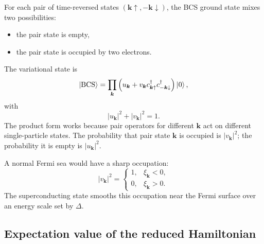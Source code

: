 \documentclass[11pt]{article}
\numberwithin{equation}{section}
\newcommand{\kvec}{\bm{k}}
\begin{document}
For each pair of time-reversed states $(\kvec\uparrow,-\kvec\downarrow)$, the BCS ground state mixes two possibilities:
\begin{itemize}[leftmargin=2em]
\item the pair state is empty,
\item the pair state is occupied by two electrons.
\end{itemize}
The variational state is
\begin{equation}
\ket{\mathrm{BCS}}=\prod_{\kvec} \left(u_{\kvec}+v_{\kvec} c_{\kvec\uparrow}^{\dagger}c_{-\kvec\downarrow}^{\dagger}\right)\ket{0},
\label{eq:bcs_state}
\end{equation}
with
\begin{equation}
|u_{\kvec}|^2+|v_{\kvec}|^2=1.
\end{equation}
The product form works because pair operators for different $\kvec$ act on different single-particle states. The probability that pair state $\kvec$ is occupied is $|v_{\kvec}|^2$; the probability it is empty is $|u_{\kvec}|^2$.

A normal Fermi sea would have a sharp occupation:
\begin{equation}
|v_{\kvec}|^2=\begin{cases}1,& \xi_{\kvec}<0,\\0,&\xi_{\kvec}>0.\end{cases}
\end{equation}
The superconducting state smooths this occupation near the Fermi surface over an energy scale set by $\Delta$.

\subsection{Expectation value of the reduced Hamiltonian}
\end{document}
